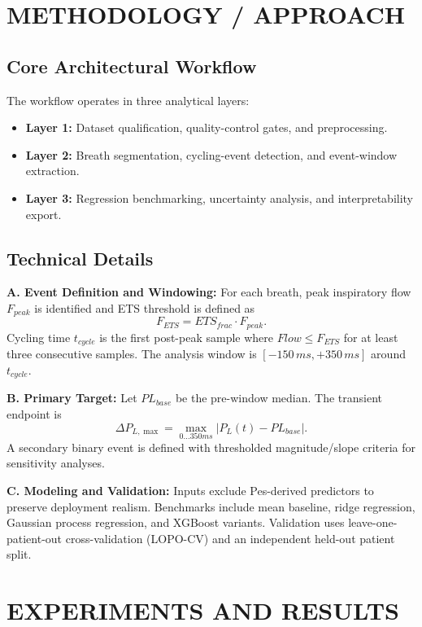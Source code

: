 \documentclass[9pt,twocolumn]{article}
\begin{document}
\section{METHODOLOGY / APPROACH}

\subsection{Core Architectural Workflow}

The workflow operates in three analytical layers:
\begin{itemize}[leftmargin=12pt]
\item \textbf{Layer 1:} Dataset qualification, quality-control gates, and preprocessing.
\item \textbf{Layer 2:} Breath segmentation, cycling-event detection, and event-window extraction.
\item \textbf{Layer 3:} Regression benchmarking, uncertainty analysis, and interpretability export.
\end{itemize}

\subsection{Technical Details}

\textbf{A. Event Definition and Windowing:} For each breath, peak inspiratory flow $F_{peak}$ is identified and ETS threshold is defined as
\[
F_{ETS}=ETS_{frac}\cdot F_{peak}.
\]
Cycling time $t_{cycle}$ is the first post-peak sample where $Flow\leq F_{ETS}$ for at least three consecutive samples. The analysis window is $[-150\,ms,+350\,ms]$ around $t_{cycle}$.

\textbf{B. Primary Target:} Let $PL_{base}$ be the pre-window median. The transient endpoint is
\[
\Delta P_{L,\max}=\max_{0\ldots 350ms}\left|P_L(t)-PL_{base}\right|.
\]
A secondary binary event is defined with thresholded magnitude/slope criteria for sensitivity analyses.

\textbf{C. Modeling and Validation:} Inputs exclude Pes-derived predictors to preserve deployment realism. Benchmarks include mean baseline, ridge regression, Gaussian process regression, and XGBoost variants. Validation uses leave-one-patient-out cross-validation (LOPO-CV) and an independent held-out patient split.

\section{EXPERIMENTS AND RESULTS}
\end{document}
